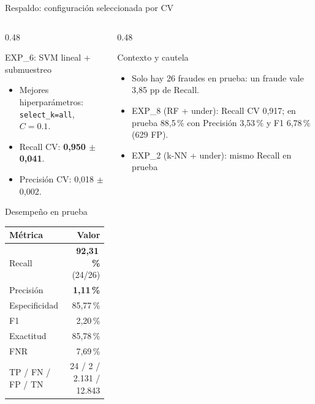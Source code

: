 \documentclass[aspectratio=169,11pt]{beamer}
\begin{document}
\begin{frame}{Respaldo: configuración seleccionada por CV}
  \begin{columns}[T]
    \begin{column}{0.48\textwidth}
      \begin{block}{EXP\_6: SVM lineal + submuestreo}
        \scriptsize
        \begin{itemize}
          \item Mejores hiperparámetros:
                \texttt{select\_k=all}, \(C=0.1\).
          \item Recall CV: \textbf{0,950 \(\pm\) 0,041}.
          \item Precisión CV: 0,018 \(\pm\) 0,002.
        \end{itemize}
      \end{block}
      \vspace{0.1cm}
      \begin{block}{Desempeño en prueba}
        \scriptsize
        \begin{tabular}{@{}lr@{}}
          \toprule
          Métrica & Valor \\
          \midrule
          Recall & \textbf{92,31\,\%} (24/26) \\
          Precisión & \textbf{1,11\,\%} \\
          Especificidad & 85,77\,\% \\
          F1 & 2,20\,\% \\
          Exactitud & 85,78\,\% \\
          FNR & 7,69\,\% \\
          TP / FN / FP / TN & 24 / 2 / 2.131 / 12.843 \\
          \bottomrule
        \end{tabular}
      \end{block}
    \end{column}
    \begin{column}{0.48\textwidth}
      \begin{block}{Contexto y cautela}
        \scriptsize
        \begin{itemize}
          \item Solo hay 26 fraudes en prueba: un fraude vale
                3,85 pp de Recall.
          \item EXP\_8 (RF + under): Recall CV 0,917; en prueba
                88,5\,\% con Precisión 3,53\,\% y F1 6,78\,\%
                (629 FP).
          \item EXP\_2 (k-NN + under): mismo Recall en prueba

\end{itemize}
\end{block}
\end{column}
\end{columns}
\end{frame}
\end{document}
